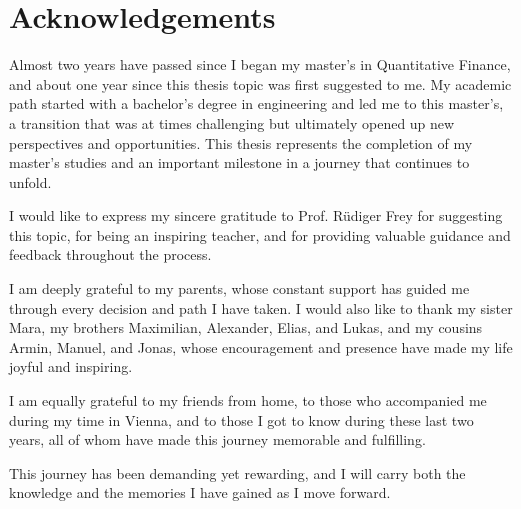 \section*{Acknowledgements}

Almost two years have passed since I began my master's in Quantitative Finance, and about one year since this thesis topic was first suggested to me. My academic path started with a bachelor's degree in engineering and led me to this master's, a transition that was at times challenging but ultimately opened up new perspectives and opportunities. This thesis represents the completion of my master's studies and an important milestone in a journey that continues to unfold.

I would like to express my sincere gratitude to Prof. Rüdiger Frey for suggesting this topic, for being an inspiring teacher, and for providing valuable guidance and feedback throughout the process.

I am deeply grateful to my parents, whose constant support has guided me through every decision and path I have taken. I would also like to thank my sister Mara, my brothers Maximilian, Alexander, Elias, and Lukas, and my cousins Armin, Manuel, and Jonas, whose encouragement and presence have made my life joyful and inspiring.

I am equally grateful to my friends from home, to those who accompanied me during my time in Vienna, and to those I got to know during these last two years, all of whom have made this journey memorable and fulfilling.

This journey has been demanding yet rewarding, and I will carry both the knowledge and the memories I have gained as I move forward.